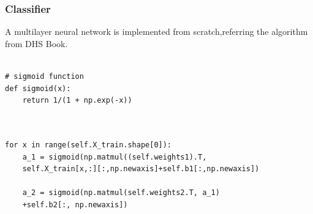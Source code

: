 \documentclass[10pt,a4paper]{article}
\begin{document}
\subsubsection{Classifier}
A multilayer neural network is implemented from scratch,referring the algorithm from DHS Book.
\lstset{%
basicstyle=\small, %
identifierstyle=, %
stringstyle=\ttfamily, %
showstringspaces=false} %
\lstset{language=Python}          %
\begin{lstlisting}[label=activation,caption=Sigmoid Function]  % Start your code-block

# sigmoid function
def sigmoid(x):
    return 1/(1 + np.exp(-x))
   
\end{lstlisting}


\lstset{%
basicstyle=\small, %
identifierstyle=, %
stringstyle=\ttfamily, %
showstringspaces=false} %
\lstset{language=Python}          %
\begin{lstlisting}[label= fwdpass,caption=forward-pass]  % Start your code-block

for x in range(self.X_train.shape[0]):
    a_1 = sigmoid(np.matmul((self.weights1).T, 
    self.X_train[x,:][:,np.newaxis]+self.b1[:,np.newaxis])
        
    a_2 = sigmoid(np.matmul(self.weights2.T, a_1)
    +self.b2[:, np.newaxis])   
   
\end{lstlisting}

\end{document}
